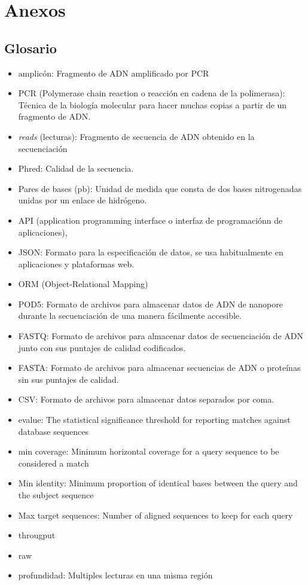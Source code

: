 \chapter{Anexos}
\section{Glosario}

\begin{itemize}
    \item amplicón: Fragmento de ADN amplificado por PCR
    \item PCR (Polymerase chain reaction o reacción en cadena de la polimerasa): Técnica de la biología molecular para hacer muchas copias a partir de un fragmento de ADN.
    \item \textit{reads} (lecturas): Fragmento de secuencia de ADN obtenido en la secuenciación
    \item Phred: Calidad de la secuencia. 
    \item Pares de bases (pb): Unidad de medida que consta de dos bases nitrogenadas unidas por un enlace de hidrógeno.
    \item API (application programming interface o interfaz de programaciónn de aplicaciones),
    \item JSON: Formato para la especificación de datos, se usa habitualmente en aplicaciones y plataformas web.
    \item ORM (Object-Relational Mapping)
    \item POD5: Formato de archivos para almacenar datos de ADN de nanopore durante la secuenciación de una manera fácilmente accesible.
    \item FASTQ: Formato de archivos para almacenar datos de secuenciación de ADN junto con sus puntajes de calidad codificados.
    \item FASTA: Formato de archivos para almacenar secuencias de ADN o proteínas sin sus puntajes de calidad.
    \item CSV: Formato de archivos para almacenar datos separados por coma.
    \item evalue: The statistical significance threshold for reporting matches against database sequences
    \item min coverage: Minimum horizontal coverage for a query sequence to be considered a match
    \item Min identity: Minimum proportion of identical bases between the query and the subject sequence
    \item Max target sequences: Number of aligned sequences to keep for each query
    \item througput
    \item raw
    \item profundidad: Multiples lecturas en una misma región
\end{itemize}
